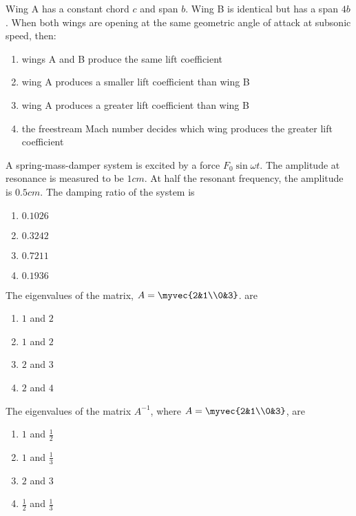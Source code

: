 	\item Wing A has a constant chord $c$ and span $b$. Wing B is identical but has a span $4b$. When both wings are opening at the same geometric angle of attack at subsonic speed, then:
		\begin{enumerate}
			\item wings A and B produce the same lift coefficient
			\item wing A produces a smaller lift coefficient than wing B
			\item wing A produces a greater lift coefficient than wing B
			\item the freestream Mach number decides which wing produces the greater lift coefficient
		\end{enumerate}


	\item A spring-mass-damper system is excited by a force $F_0 \sin \omega t$. The amplitude at resonance is measured to be $1cm$. At half the resonant frequency, the amplitude is $0.5cm$. The damping ratio of the system is
		\begin{enumerate}
			\item $0.1026$
			\item $0.3242$
			\item $0.7211$
			\item $0.1936$
		\end{enumerate}

	\item The eigenvalues of the matrix, $A = \myvec{2&1\\0&3}$. are
		\begin{enumerate}
			\item $1$ and $2$
			\item $1$ and $2$
			\item $2$ and $3$
			\item $2$ and $4$
		\end{enumerate}

	\item The eigenvalues of the matrix $A^{-1}$, where $A = \myvec{2&1\\0&3}$, are
		\begin{enumerate}
			\item $1$ and $\frac{1}{2}$
			\item $1$ and $\frac{1}{3}$
			\item $2$ and $3$
			\item $\frac{1}{2}$ and $\frac{1}{3}$
		\end{enumerate}

